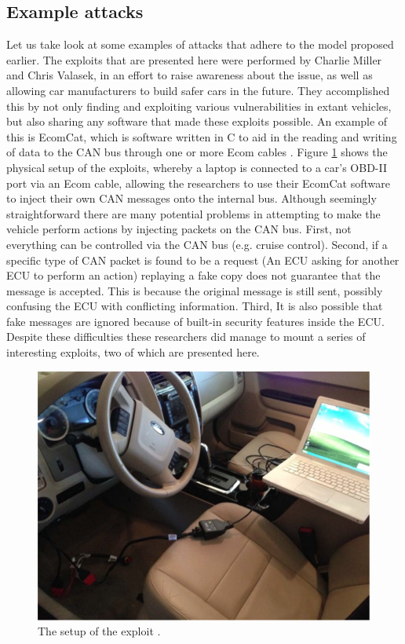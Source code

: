 \documentclass[master=cws,masteroption=vs,english]{kulemt}
\begin{document}
\subsection{Example attacks}
\label{sec:example_attacks}
 Let us take look at some examples of attacks that adhere to the model proposed earlier. The exploits that are presented here were performed by Charlie Miller and Chris Valasek, in an effort to raise awareness about the issue, as well as allowing car manufacturers to build safer cars in the future. They accomplished this by not only finding and exploiting various vulnerabilities in extant vehicles, but also sharing any software that made these exploits possible. An example of this is EcomCat, which is software written in C to aid in the reading and writing of data to the CAN bus through one or more Ecom cables \cite{MillerC}. Figure \ref{fig:exploitsetup} shows the physical setup of the exploits, whereby a laptop is connected to a car's OBD-II port via an Ecom cable, allowing the researchers to use their EcomCat software to inject their own CAN messages onto the internal bus. Although seemingly straightforward there are many potential problems in attempting to make the vehicle perform actions by injecting packets on the CAN bus. First, not everything can be controlled via the CAN bus (e.g. cruise control). Second, if a specific type of CAN packet is found to be a request (An ECU asking for another ECU to perform an action) replaying a fake copy does not guarantee that the message is accepted. This is because the original message is still sent, possibly confusing the ECU with conflicting information. Third, It is also possible that fake messages are ignored because of built-in security features inside the ECU. Despite these difficulties these researchers did manage to mount a series of interesting exploits, two of which are presented here.

\begin{figure}[h]
	\label{fig:exploitsetup}
	\centering
	\includegraphics[width=\textwidth]{ExploitSetup.png}
	\caption{The setup of the exploit \cite{MillerC}.}
\end{figure}
\end{document}

